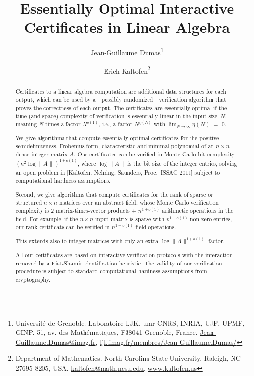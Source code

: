 \documentclass{article}
\author{\addtocounter{footnote}{1}  
Jean-Guillaume Dumas\footnote{
Universit\'e de Grenoble. 
Laboratoire LJK,
umr CNRS, INRIA, UJF, UPMF, GINP.
51, av. des Math\'ematiques, F38041 Grenoble, France.
\href{mailto:Jean-Guillaume.Dumas@imag.fr}{Jean-Guillaume.Dumas@imag.fr},
\href{http://ljk.imag.fr/membres/Jean-Guillaume.Dumas/}{ljk.imag.fr/membres/Jean-Guillaume.Dumas/}
}
\and  
Erich Kaltofen\footnote{
Department of Mathematics.
North Carolina State University.
Raleigh, NC 27695-8205, USA.
\href{mailto:kaltofen@math.ncsu.edu}{kaltofen@math.ncsu.edu},
\href{http://www.kaltofen.us}{www.kaltofen.us}
}
}
\title{Essentially Optimal Interactive Certificates in Linear Algebra\texorpdfstring{\raisebox{0ex}{*}}{}}
\newcommand{\makeconference}{}
\newcommand{\lognormA}{\log\| A\mspace{1mu} \|}
\begin{document}
\makeconference
\maketitle
\def\thefootnote{\fnsymbol{footnote}}  

\begin{abstract}
 
 
 
 
 
 
 
 
 
 
 
 
 
 
 
 
 
 
 
 
Certificates to a linear algebra computation are
additional data structures for each output, which can be used
by a---possibly randomized---verification algorithm that proves the
correctness of each output.  The certificates are essentially optimal
if the time
(and space)  
complexity of verification is essentially linear
in the input size~$N$, meaning
$N$ times  
a factor $N^{o(1)}$,
i.e.,  
a factor $N^{\eta(N)}$ with $\lim_{N\to \infty} \eta(N)$ $=$ $0$.

We give algorithms that compute essentially optimal certificates for the positive semidefiniteness,
Frobenius form, characteristic and minimal polynomial of an $n\times n$ dense
integer matrix $A$.  Our certificates can be verified in Monte-Carlo bit
complexity $(n^2 \lognormA)^{1+o(1)}$, where $\lognormA$ is the bit size of the
integer entries,
solving  
an open problem in [Kaltofen, Nehring, Saunders, Proc.\ ISSAC 2011] subject
to computational hardness assumptions.

Second, we give algorithms that compute certificates for the rank of sparse or structured
$n\times n$ matrices over an abstract field, whose Monte Carlo verification complexity
is $2$ matrix-times-vector products $+$ $n^{1+o(1)}$ arithmetic operations in the field.
For example, if the $n\times n$ input matrix is sparse with
$n^{1+o(1)}$ non-zero entries,  
our rank certificate can be verified in
$n^{1+o(1)}$ field operations.
 
This extends also to integer matrices with only an extra $\lognormA^{1+o(1)}$
factor.

All our certificates are based on interactive verification protocols with
the interaction removed by a Fiat-Shamir identification heuristic.  The
validity of our verification procedure is subject to
standard computational hardness assumptions from cryptography.  
\par  
\end{abstract}
 
\end{document}
